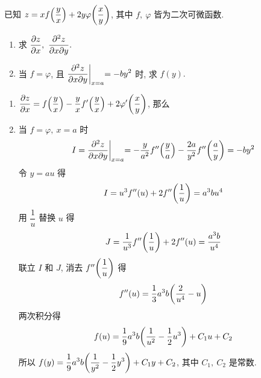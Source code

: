 \begin{example}
    已知 $z=xf\qty(\dfrac{y}{x})+2y\varphi\qty(\dfrac{x}{y})$, 其中 $f,~\varphi$ 皆为二次可微函数.
    \begin{enumerate}[label=(\arabic{*})]
        \item 求 $\displaystyle \pdv{z}{x},~\pdv{z}{x}{y}.$
        \item 当 $f=\varphi$, 且 $\displaystyle \pdv{z}{x}{y}\biggl |_{x=a}=-by^2$ 时, 求 $f(y).$
    \end{enumerate}
\end{example}
\begin{solution}
    \begin{enumerate}[label=(\arabic{*})]
        \item $\displaystyle\pdv{z}{x}=f\qty(\dfrac{y}{x})-\dfrac{y}{x}f'\qty(\dfrac{y}{x})+2\varphi'\qty(\dfrac{x}{y})$, 那么
        \item 当 $f=\varphi,~x=a$ 时
              $$I=\pdv{z}{x}{y}\biggl |_{x=a}=-\dfrac{y}{a^2}f''\qty(\dfrac{y}{a})-\dfrac{2a}{y^2}f''\qty(\dfrac{a}{y})=-by^2$$
              令 $y=au$ 得 $$\displaystyle I=u^3f''(u)+2f''\qty(\dfrac{1}{u})=a^3bu^4$$ 用 $\dfrac{1}{u}$ 替换 $u$ 得 $$J=\dfrac{1}{u^3}f''\qty(\dfrac{1}{u})+2f''(u)=\dfrac{a^3b}{u^4}$$
              联立 $I$ 和 $J$, 消去 $f''\qty(\dfrac{1}{u})$ 得 $$f''(u)=\dfrac{1}{3}a^3b\qty(\dfrac{2}{u^4}-u)$$ 两次积分得
              $$f(u)=\dfrac{1}{9}a^3b\qty(\dfrac{1}{u^2}-\dfrac{1}{2}u^3)+C_1u+C_2$$
              所以 $\displaystyle f(y)=\dfrac{1}{9}a^3b\qty(\dfrac{1}{y^2}-\dfrac{1}{2}y^3)+C_1y+C_2$, 其中 $C_1,~C_2$ 是常数.
    \end{enumerate}
\end{solution}

